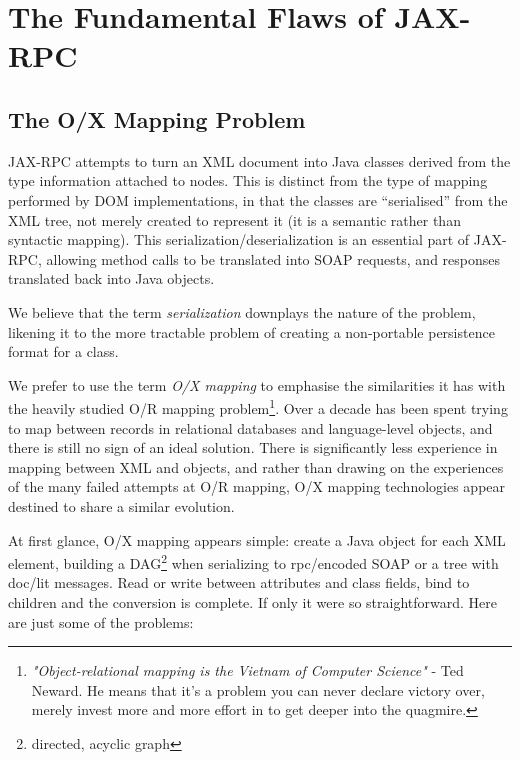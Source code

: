 \section{The Fundamental Flaws of JAX-RPC}
\label{objections}

\subsection{The O/X Mapping Problem}
\label{objections:o-x}

JAX-RPC attempts to turn an XML
document into Java classes derived from the type information attached to
nodes. This is distinct from the type of mapping performed by DOM
implementations, in that the classes are ``serialised'' from the XML
tree, not merely created to represent it (it is a semantic rather than
syntactic mapping). This serialization/deserialization is an essential part of JAX-RPC,
allowing method calls to be translated into SOAP requests, and responses
translated back into Java objects.

We believe that the term \emph{serialization} downplays the nature of
the problem, likening it to the more tractable problem of creating a
non-portable persistence format for a class. 

We prefer to use the term \emph{O/X mapping} to emphasise the
similarities it has with the heavily studied O/R mapping
problem\footnote{ \emph{"Object-relational mapping is the Vietnam of
Computer Science"} - Ted Neward. He means that it's a problem you can
never declare victory over, merely invest more and more effort in to
get deeper into the quagmire.
}. 
Over a decade has been spent trying to map between records in 
relational databases and language-level objects, and there is still no
sign of an ideal solution.  
There is significantly less experience in mapping between XML and objects, and
rather than drawing on the experiences of the many failed attempts at
O/R mapping, O/X mapping technologies appear destined to share a
similar evolution.

At first glance, O/X mapping appears simple: create a Java object
for each XML element, building a DAG\footnote{directed, acyclic graph}
when serializing to rpc/encoded SOAP or a tree with doc/lit
messages. Read or write between attributes and class fields, bind to
children and the conversion is complete. If only it were so
straightforward. Here are just some of the problems:

